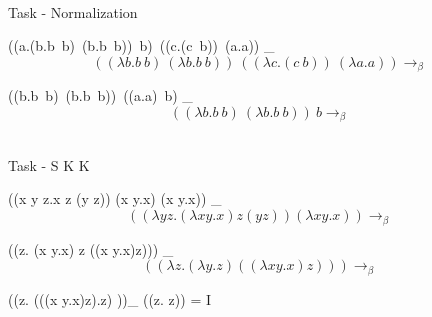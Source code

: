 \documentclass{article}
\begin{document}
\\Task - Normalization


((\lambda a.(\lambda b.b\ b)\ (\lambda b.b\ b))\ b)\ ((\lambda c.(c\ b))\ (\lambda a.a)) \rightarrow_\beta$$

((\lambda b.b\ b)\ (\lambda b.b\ b))\ ((\lambda c.(c\ b))\ (\lambda a.a)) \rightarrow_\beta$$

((\lambda b.b\ b)\ (\lambda b.b\ b))\ ((\lambda a.a)\ b) \rightarrow_\beta$$

((\lambda b.b\ b)\ (\lambda b.b\ b))\ b \rightarrow_\beta$$


\\Task - S K K

((\lambda x y z.x z (y z)) (\lambda x y.x) (\lambda x y.x)) \rightarrow_\beta$$

((\lambda y z.(\lambda x y.x) z (y z)) (\lambda x y.x)) \rightarrow_\beta$$

((\lambda z. (\lambda x y.x) z ((\lambda x y.x)z))) \rightarrow_\beta$$

((\lambda z. (\lambda y.z) ((\lambda x y.x)z))) \rightarrow_\beta$$

((\lambda z. (\lambda ((\lambda x y.x)z).z) ))\rightarrow_\beta$$ 
((\lambda z. z)) = I
    
\end{document}
